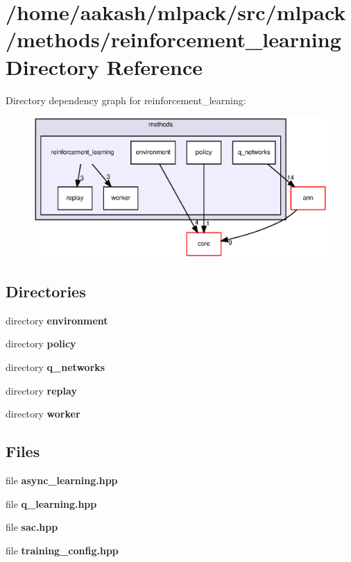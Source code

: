 \section{/home/aakash/mlpack/src/mlpack/methods/reinforcement\+\_\+learning Directory Reference}
\label{dir_254f9df45df455918509dd3e8386cc26}
Directory dependency graph for reinforcement\+\_\+learning\+:
\nopagebreak
\begin{figure}[H]
\begin{center}
\leavevmode
\includegraphics[width=350pt]{dir_254f9df45df455918509dd3e8386cc26_dep}
\end{center}
\end{figure}
\subsection*{Directories}
\begin{DoxyCompactItemize}
\item 
directory \textbf{ environment}
\item 
directory \textbf{ policy}
\item 
directory \textbf{ q\+\_\+networks}
\item 
directory \textbf{ replay}
\item 
directory \textbf{ worker}
\end{DoxyCompactItemize}
\subsection*{Files}
\begin{DoxyCompactItemize}
\item 
file \textbf{ async\+\_\+learning.\+hpp}
\item 
file \textbf{ q\+\_\+learning.\+hpp}
\item 
file \textbf{ sac.\+hpp}
\item 
file \textbf{ training\+\_\+config.\+hpp}
\end{DoxyCompactItemize}
